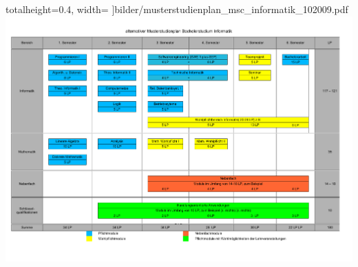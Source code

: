 \documentclass[12pt]{n-te}
\newcommand{\mehrInfo}[1]{\fbox{$\rightarrow$ #1 }}
\begin{document}
totalheight=0.4\textheight, 
width=\textwidth
]{bilder/musterstudienplan_msc_informatik_102009.pdf}
\\
\includegraphics[angle=90,totalheight=\textheight
, width=\textwidth]{texte/bachelor/studienplan_neu.pdf}
\newpage
\begin{multicols}{2}

  \end{multicols}
\end{document}
